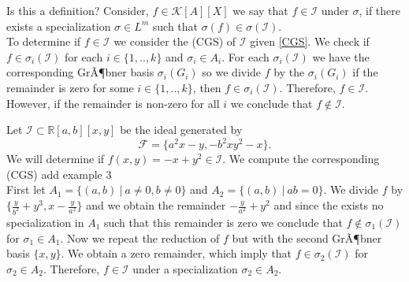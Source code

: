 \documentclass[runningheads]{llncs}
\newcommand{\Rr}{\mathbb{R}}
\newcommand{\1}{\chi}
\newcommand{\Ff}{\mathcal{F}}
\newcommand{\Ii}{\mathcal{I}}
\newcommand{\Kk}{\mathcal{K}}
\begin{document}
{\color{red} Is this a definition?}
 Consider, $f\in \Kk[A][X]$ we say that $f\in\Ii$ under $\sigma$, if there exists a specialization 
 $\sigma\in L^m$ such that $\sigma(f)\in\sigma(\Ii)$.\\

To determine if $f\in\Ii$ we consider the (CGS) of $\Ii$ given \ref{CGS}. 
We check if $f\in\sigma_i(\Ii)$ for each $i\in\{1,..,k\}$ and $\sigma_i\in A_i$.
For each $\sigma_i(\Ii)$ we have the corresponding GrÃ¶bner basis $\sigma_i(G_i)$
so we divide $f$ by the $\sigma_i(G_i)$ if the remainder is zero for some $i\in\{1,..,k\}$,
then $f\in\sigma_i(\Ii)$. Therefore, $f\in\Ii$. However, if the remainder is non-zero for all $i$ we conclude that 
$f\notin\Ii$.

\begin{example}
	Let $\mathcal{I}\subset \Rr[a,b][x,y]$ be the ideal generated by 
    $$\Ff=\{a^2 x - y, -b^2 x y^2 - x\}.$$
	We will determine if $f(x,y)=-x+y^2\in\mathcal{I}$.
	We compute the corresponding (CGS)
	{\color{red} add example 3}\\
	First let $A_1=\{(a,b)~|~ a\ne 0, b\ne 0\}$ and $A_2=\{(a,b)~|~ ab=0\}$. 
	We divide $f$ by $\{\frac{y}{b^2}+y^3,x-\frac{y}{a^2}\}$ and we obtain the remainder $-\frac{y}{a^2}+y^2$ and 
	since the exists no specialization in $A_1$ such that this remainder is zero we conclude that $f\notin \sigma_1(\Ii)$ for
	$\sigma_1\in A_1$. Now we repeat the reduction of $f$ but with the second GrÃ¶bner basis $\{x,y\}$. We obtain a zero remainder, which imply that 
	$f\in \sigma_2(\Ii)$ for $\sigma_2\in A_2$. Therefore, $f\in\Ii$ under a specialization $\sigma_2\in A_2$.
\end{example}







\newpage
\end{document}
